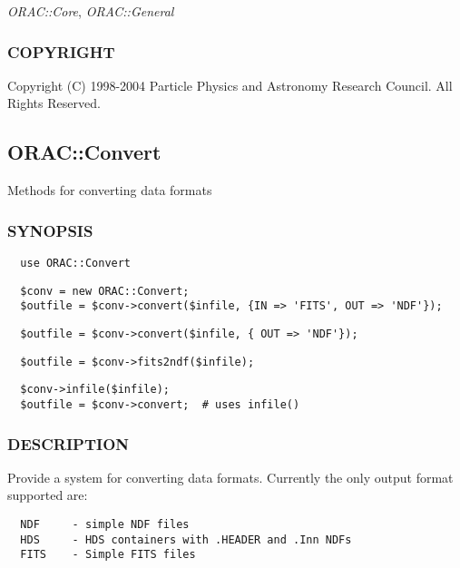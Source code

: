 \emph{ORAC::Core}, \emph{ORAC::General}

\subsubsection*{COPYRIGHT\label{ORAC::Basic_COPYRIGHT}}


Copyright (C) 1998-2004 Particle Physics and Astronomy Research
Council. All Rights Reserved.

\subsection{ORAC::Convert\label{ORAC::Convert}}


Methods for converting data formats

\subsubsection*{SYNOPSIS\label{ORAC::Convert_SYNOPSIS}}
\begin{verbatim}
  use ORAC::Convert
\end{verbatim}
\begin{verbatim}
  $conv = new ORAC::Convert;
  $outfile = $conv->convert($infile, {IN => 'FITS', OUT => 'NDF'});
\end{verbatim}
\begin{verbatim}
  $outfile = $conv->convert($infile, { OUT => 'NDF'});
\end{verbatim}
\begin{verbatim}
  $outfile = $conv->fits2ndf($infile);
\end{verbatim}
\begin{verbatim}
  $conv->infile($infile);
  $outfile = $conv->convert;  # uses infile()
\end{verbatim}
\subsubsection*{DESCRIPTION\label{ORAC::Convert_DESCRIPTION}}


Provide a system for converting data formats. Currently the
only output format supported are:

\begin{verbatim}
  NDF     - simple NDF files
  HDS     - HDS containers with .HEADER and .Inn NDFs
  FITS    - Simple FITS files
\end{verbatim}



